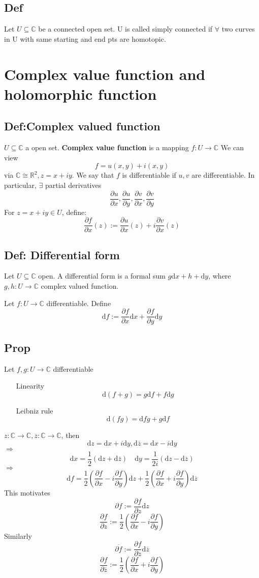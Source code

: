 \documentclass{book}
\begin{document}
\section{Def}
Let $U\subseteq \mathbb C$ be a connected open set. U is called simply connected if $\forall$ two curves in U with same starting and end pts are homotopic.
\chapter{Complex value function and holomorphic function}
\section{Def:Complex valued function}
$U\subseteq \mathbb C$ a open set. \textbf{Complex value function} is a mapping $f:U\rightarrow \mathbb C$ We can view $$f=u(x,y)+i(x,y)$$ via $\mathbb C\cong\mathbb R^2, z=x+iy$. We say that $f$ is differentiable if $u,v$ are differentiable. In particular, $\exists$ partial derivatives $$\frac{\partial u}{\partial x},\frac{\partial u}{\partial y},\frac{\partial v}{\partial x},\frac{\partial v}{\partial y}$$
For $z=x+iy\in U$, define:
$$\frac{\partial f}{\partial x}(z):=\frac{\partial u}{\partial x}(z)+i\frac{\partial v}{\partial x}(z)$$
\section{Def: Differential form}
Let $U\subseteq \mathbb C$ open. A differential form is a formal sum $g\text{d}x+h+\text{d}y$, where $g,h:U\rightarrow \mathbb C$ complex valued function.

Let $f:U\rightarrow \mathbb C$ differentiable. Define $$\text{d}f:=\frac{\partial f}{\partial x}\text{d}x+\frac{\partial f}{\partial y}\text{d}y$$
\section{Prop}
Let $f,g:U\rightarrow \mathbb C$ differentiable
\begin{itemize}
    \item[Linearity] $$\text{d}(f+g)=g\text{d}f+f\text{d}g$$
    \item[Leibniz rule]$$\text{d}(fg)=\text{d}f g+g\text{d}f$$ 
\end{itemize}

$z:\mathbb C\rightarrow\mathbb C,\overline z:\mathbb C\rightarrow \mathbb C$, then 
$$\text{d}z=\text{d}x+i\text{d}y,\text{d}\overline z=\text{d}x-i\text{d}y$$
$\Rightarrow$$$\text{d}x=\frac{1}2(\text{d}z+\text{d}\overline z)\quad \text{d}y=\frac{1}{2i}(\text{d}z-\text{d}\overline z)$$
$\Rightarrow$$$\text{d}f=\frac{1}2(\frac{\partial f}{\partial x}-i\frac{\partial f}{\partial y})\text{d}z+\frac{1}2(\frac{\partial f}{\partial x}+i\frac{\partial f}{\partial y})\text{d}\overline z$$
This motivates $$\partial f:=\frac{\partial f}{\partial z}\text{d}z$$
$$\frac{\partial f}{\partial z}:=\frac{1}2(\frac{\partial f}{\partial x}-i\frac{\partial f}{\partial y})$$
Similarly$$\overline{\partial f}:=\frac{\partial f}{\partial\overline z}\text{d}\overline z$$
$$\frac{\partial f}{\partial\overline z}:=\frac{1}2(\frac{\partial f}{\partial x}+i\frac{\partial f}{\partial y})$$
\end{document}
